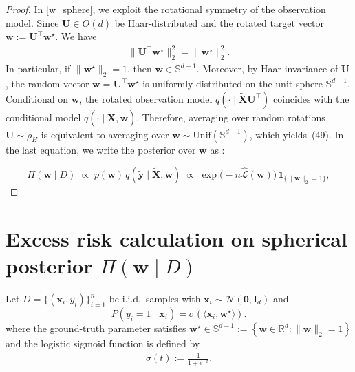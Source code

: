 \documentclass{article}
\theoremstyle{plain}
\theoremstyle{definition}
\theoremstyle{remark}
\begin{document}
{\begin{proof}
In \eqref{w_sphere}, we exploit the rotational symmetry of the observation model. 
Since $\mathbf U \in O(d)$ be Haar-distributed and the rotated target vector 
$\mathbf w := \mathbf U^\top \mathbf w^\star$. We have
\begin{align}
\big\lVert \mathbf U^\top \mathbf w^\star \big\rVert_2^2
= \big\lVert \mathbf w^\star \big\rVert_2^2 .
\end{align}
In particular, if $\lVert \mathbf w^\star \rVert_2 = 1$, then $\mathbf w \in \mathbb S^{d-1}$. 
Moreover, by Haar invariance of $\mathbf U$, the random vector 
$\mathbf w = \mathbf U^\top \mathbf w^\star$ is uniformly distributed on the unit sphere 
$\mathbb S^{d-1}$. 
Conditional on $\mathbf w$, the rotated observation model 
$q(\cdot \mid \tilde{\mathbf X}\mathbf U^\top)$ coincides with the conditional model 
$q(\cdot \mid \tilde{\mathbf X}, \mathbf w)$. 
Therefore, averaging over random rotations $\mathbf U \sim \rho_H$ is equivalent to 
averaging over $\mathbf w \sim \mathrm{Unif}(\mathbb S^{d-1})$, which yields~(49). In the last equation, we write the posterior over $\mathbf{w}$ as :


\begin{equation}
\Pi(\mathbf{w} \mid D)
\;\propto\;
p(\boldsymbol w)\,q(\tilde{\boldsymbol y}\mid \tilde{\boldsymbol X},\boldsymbol w)
\;\propto\;
\exp\!\big(-n \hat{\mathcal{L}}(\boldsymbol w)\big)\,\mathbf 1_{\{\|\boldsymbol w\|_2=1\}},
\end{equation}

\end{proof}




\section{Excess risk calculation on spherical posterior $\Pi(\mathbf{w} \mid D)$}

Let $D = \{(\mathbf{x}_i, y_i)\}_{i=1}^n$ be i.i.d.\ samples with 
$\mathbf{x}_i \sim \mathcal{N}(\mathbf{0}, \mathbf{I}_d)$ and 
\[
P(y_i = 1 \mid \mathbf{x}_i) = \sigma\!\left( \langle \mathbf{x}_i, \mathbf{w}^\star \rangle \right).
\]
where the ground-truth parameter satisfies
$
\mathbf{w}^\star \in \mathbb{S}^{d-1}
:= \left\{ \mathbf{w} \in \mathbb{R}^d : \|\mathbf{w}\|_2 = 1 \right\}$
and the logistic sigmoid function is defined by
\begin{align}
\sigma(t) := \frac{1}{1+e^{-t}}.
\end{align}



}
\end{document}
